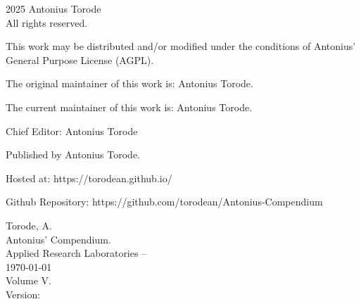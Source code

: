 \pagestyle{empty}
\begingroup
\footnotesize
\parindent 0pt
\parskip \baselineskip
\textcopyright{} 2025 Antonius Torode \\
All rights reserved.

This work may be distributed and/or modified under the conditions of Antonius’ General Purpose License (AGPL).

The original maintainer of this work is: Antonius Torode.

The current maintainer of this work is: Antonius Torode.


Chief Editor: Antonius Torode


Published by Antonius Torode. 

Hosted at: https://torodean.github.io/

Github Repository: https://github.com/torodean/Antonius-Compendium


\vfill

Torode, A.\\
\hspace*{1em} Antonius' Compendium. \\
\hspace*{2em} Applied Research Laboratories -- \\
\hspace*{2em} \today \\
\hspace*{2em} Volume V. \\
\hspace*{2em} Version: \Version



\endgroup
\clearpage